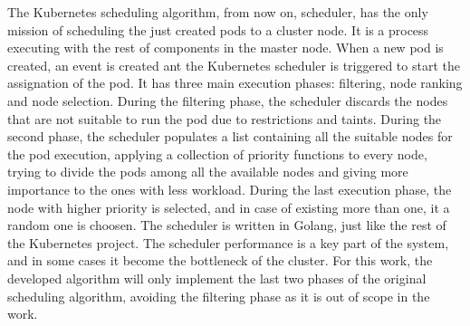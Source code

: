 \documentclass[conference]{IEEEtran}
\begin{document}
The Kubernetes scheduling algorithm, from now on, scheduler, has the only mission of scheduling
the just created pods to a cluster node. It is a process executing with the rest of components
in the master node. When a new pod is created, an event is created ant the Kubernetes scheduler is 
triggered to start the assignation of the pod. It has three main execution phases: filtering,
node ranking and node selection. During the filtering phase, the scheduler discards the nodes
that are not suitable to run the pod due to restrictions and taints. During the second phase, 
the scheduler populates a list containing all the suitable nodes for the pod execution, applying
a collection of priority functions to every node, trying to divide the pods among all the
available nodes and giving more importance to the ones with less workload. During the last execution
phase, the node with higher priority is selected, and in case of existing more than one, it a random 
one is choosen. 
The scheduler is written in Golang, just like the rest of the Kubernetes project. The scheduler
performance is a key part of the system, and in some cases it become the bottleneck of the cluster.
For this work, the developed algorithm will only implement the last two phases of the original
scheduling algorithm, avoiding the filtering phase as it is out of scope in the work.


\end{document}
